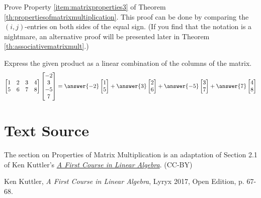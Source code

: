 \documentclass{ximera}
\begin{document}
\begin{problem}\label{prob:matrixproperties3}
Prove Property \ref{item:matrixproperties3} of Theorem \ref{th:propertiesofmatrixmultiplication}.  This proof can be done by comparing the $(i,j)$-entries on both sides of the equal sign.  (If you find that the notation is a nightmare, an alternative proof will be presented later in Theorem \ref{th:associativematrixmult}.)
\end{problem}

\begin{problem}\label{prob:lincombcols}
Express the given product as a linear combination of the columns of the matrix.
$$\begin{bmatrix}1&2&3&4\\5&6&7&8\end{bmatrix}\begin{bmatrix}-2\\3\\-5\\7\end{bmatrix}=\answer{-2}\begin{bmatrix}1\\5\end{bmatrix}+\answer{3}\begin{bmatrix}2\\6\end{bmatrix}+\answer{-5}\begin{bmatrix}3\\7\end{bmatrix}+\answer{7}\begin{bmatrix}4\\8\end{bmatrix}$$
\end{problem}

\section*{Text Source}
The section on Properties of Matrix Multiplication is an adaptation of Section 2.1 of Ken Kuttler's \href{https://open.umn.edu/opentextbooks/textbooks/a-first-course-in-linear-algebra-2017}{\it A First Course in Linear Algebra}. (CC-BY)

Ken Kuttler, {\it  A First Course in Linear Algebra}, Lyryx 2017, Open Edition, p. 67-68.
\end{document}
